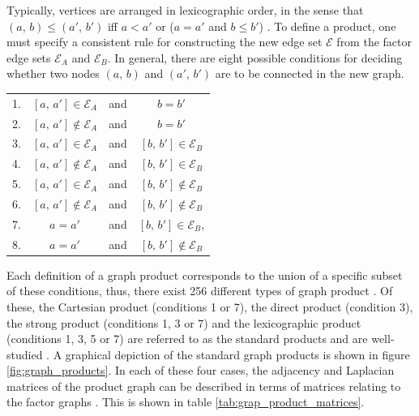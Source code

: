 Typically, vertices are arranged in lexicographic order, in the sense that $(a, \, b) \leq (a',\, b')$ iff $a < a'$ or ($a = a'$ and $b \leq b'$) \citep{Harzheim2005}. To define a product, one must specify a consistent rule for constructing the new edge set $\mathcal{E}$ from the factor edge sets $\mathcal{E}_A$ and $\mathcal{E}_B$. In general, there are eight possible conditions for deciding whether two nodes $(a, \, b)$ and $(a',\,  b')$ are to be connected in the new graph.


\begin{table}[h]
    \def\arraystretch{1.5}
    \centering
    \begin{tabular}{lclc}
        1. & $[a, \, a'] \in \mathcal{E}_A$    & and & $b = b'$                          \\
        2. & $[a, \, a'] \notin \mathcal{E}_A$ & and & $b = b'$                          \\
        3. & $[a, \, a'] \in \mathcal{E}_A$    & and & $[b, \, b'] \in \mathcal{E}_B$    \\
        4. & $[a, \, a'] \notin \mathcal{E}_A$ & and & $[b, \, b'] \in \mathcal{E}_B$    \\
        5. & $[a, \, a'] \in \mathcal{E}_A$    & and & $[b, \, b'] \notin \mathcal{E}_B$ \\
        6. & $[a, \, a'] \notin \mathcal{E}_A$ & and & $[b, \, b'] \notin \mathcal{E}_B$ \\
        7. & $a = a'$                          & and & $[b, \, b'] \in \mathcal{E}_B$,   \\
        8. & $a = a'$                          & and & $[b, \, b'] \notin \mathcal{E}_B$
    \end{tabular}
\end{table}



Each definition of a graph product corresponds to the union of a specific subset of these conditions, thus, there exist 256 different types of graph product \citep{Barik2015}. Of these, the Cartesian product (conditions 1 or 7), the direct product (condition 3), the strong product (conditions 1, 3 or 7) and the lexicographic product (conditions 1, 3, 5 or 7) are referred to as the standard products and are well-studied \citep{Imrich2000}. A graphical depiction of the standard graph products is shown in figure \ref{fig:graph_products}. In each of these four cases, the adjacency and Laplacian matrices of the product graph can be described in terms of matrices relating to the factor graphs \citep{Fiedler1973, Barik2018}. This is shown in table \ref{tab:grap_product_matrices}.

